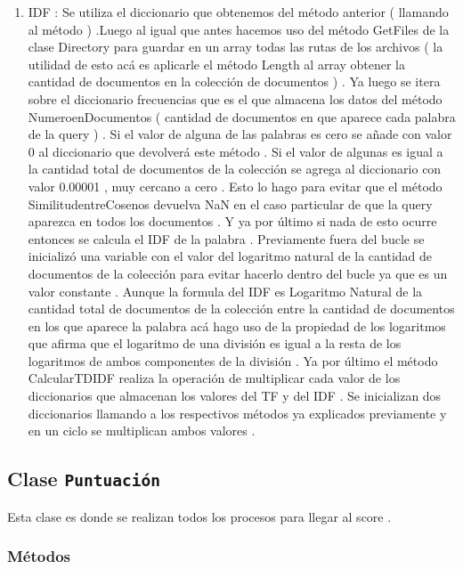 \documentclass[10pt]{extarticle}
\begin{document}
\begin{enumerate}
	\item  IDF : Se utiliza el diccionario que obtenemos del método anterior ( 	llamando al método ) .Luego al igual que antes hacemos uso del método GetFiles de la clase Directory para guardar en un array todas las rutas 	de los archivos ( la utilidad de esto acá es aplicarle el método Length al array obtener la cantidad de documentos en la colección de documentos ) . Ya luego se itera sobre el diccionario frecuencias que es el que almacena los datos del método NumeroenDocumentos ( cantidad de documentos en 	que aparece cada palabra de la query ) . Si el valor de alguna de las palabras es cero se añade con	valor 0 al diccionario que devolverá este método . Si el valor de algunas es igual a la cantidad total 	de documentos de la colección se agrega al diccionario con valor 0.00001 , muy cercano a cero . 	Esto lo hago para evitar que el método SimilitudentreCosenos devuelva NaN en el caso particular de que la query aparezca en todos los documentos . Y ya por último si nada de esto ocurre entonces se calcula el IDF de la palabra . Previamente fuera del bucle se inicializó una variable con el valor del logaritmo natural de la cantidad de documentos de la colección para evitar hacerlo dentro del bucle ya que es un valor constante . Aunque la formula del IDF es Logaritmo Natural de 	la cantidad total de documentos de la colección entre la cantidad de documentos en los que 	aparece la palabra acá hago uso de la propiedad de los logaritmos que afirma que el logaritmo de una división es igual a la resta de los logaritmos de ambos componentes de la división . 	Ya por último el método CalcularTDIDF realiza la operación de multiplicar cada valor de los 	diccionarios que almacenan los valores del TF y del IDF . Se inicializan dos diccionarios llamando a 	los respectivos métodos ya explicados previamente y en un ciclo se multiplican ambos valores . 
	
\end{enumerate}

\subsection{Clase \texttt{Puntuación}}\label{sub:puntuacion}

Esta clase es donde se realizan todos los procesos para llegar al score .

\subsubsection{Métodos}
\end{document}
